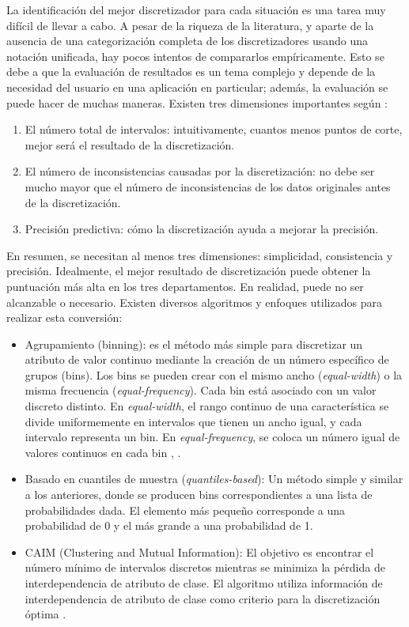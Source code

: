 La identificación del mejor discretizador para cada situación es una tarea muy difícil de llevar a cabo. A pesar de la riqueza de la literatura, y aparte de la ausencia de una categorización completa de los discretizadores usando una notación unificada, hay pocos intentos de compararlos empíricamente. Esto se debe a que la evaluación de resultados es un tema complejo y depende de la necesidad del usuario en una aplicación en particular; además, la evaluación se puede hacer de muchas maneras. Existen tres dimensiones importantes según \citep{liu2002discretization}: 
\begin{enumerate}
	\item El número total de intervalos: intuitivamente, cuantos menos puntos de corte, mejor será el resultado de la discretización.
	\item El número de inconsistencias causadas por la discretización: no debe ser mucho mayor que el número de inconsistencias de los datos originales antes de la discretización.
	\item Precisión predictiva: cómo la discretización ayuda a mejorar la precisión.
\end{enumerate}
En resumen, se necesitan al menos tres dimensiones: simplicidad, consistencia y precisión. Idealmente, el mejor resultado de discretización puede obtener la puntuación más alta en los tres departamentos. En realidad, puede no ser alcanzable o necesario. Existen diversos algoritmos y enfoques utilizados para realizar esta conversión:

\begin{itemize}
	
	\item Agrupamiento (binning): es el método más simple para discretizar un atributo de valor continuo mediante la creación de un número específico de grupos (bins). Los bins se pueden crear con el mismo ancho (\textit{equal-width}) o la misma frecuencia (\textit{equal-frequency}). Cada bin está asociado con un valor discreto distinto. En \textit{equal-width}, el rango continuo de una característica se divide uniformemente en intervalos que tienen un ancho igual, y cada intervalo representa un bin. En \textit{equal-frequency}, se coloca un número igual de valores continuos en cada bin \citep{liu2002discretization}, \citep{yang2009discretization}. 
	
	\item Basado en cuantiles de muestra (\textit{quantiles-based}): Un método simple y similar a los anteriores, donde se producen bins correspondientes a una lista de probabilidades dada. El elemento más pequeño corresponde a una probabilidad de 0 y el más grande a una probabilidad de 1. 
	
	\item CAIM (Clustering and Mutual Information): El objetivo es encontrar el número mínimo de intervalos discretos mientras se minimiza la pérdida de interdependencia de atributo de clase. El algoritmo utiliza información de interdependencia de atributo de clase como criterio para la discretización óptima \citep{kurgan2004caim}. 
	
\end{itemize}


